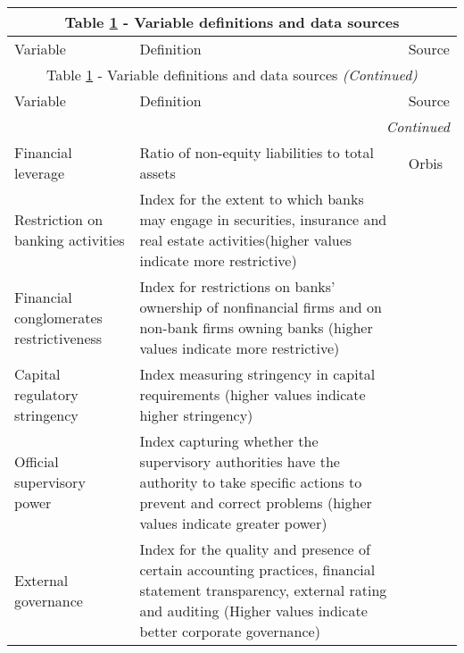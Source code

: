 	\centering
		\begin{longtable}{p{2.5in}p{4in}p{2in}}
				\label{tab:definition}\\
			\multicolumn{3}{c}{Table \ref{tab:definition} - Variable definitions and data sources}\\
			\hline 
			Variable      & Definition & Source \\
			\hline \endfirsthead
			
				\multicolumn{3}{c}{Table \ref{tab:definition} - Variable definitions and data sources \textit{(Continued)}}\\
			\hline 
			Variable      & Definition & Source \\
			\hline \endhead
			
			\hline
			\multicolumn{3}{r}{{\textit{Continued}}}\\ 
			\endfoot
			\hline
			\endlastfoot
			Financial leverage      & Ratio of non-equity liabilities to total assets & Orbis \\
		
		Restriction on banking activities & Index for the extent to which banks may engage in securities, insurance and real estate activities(higher values indicate more restrictive) & \cite{barth2013bank}\\
			
			Financial conglomerates restrictiveness & Index for restrictions on banks' ownership of nonfinancial firms and on non-bank firms owning banks (higher values indicate more restrictive) & \cite{barth2013bank}\\	
			
			Capital regulatory stringency & Index measuring stringency in capital requirements (higher values indicate higher stringency) & \cite{barth2013bank}\\
			
			Official supervisory power & Index capturing whether the supervisory authorities have the authority to take specific actions to prevent and correct problems (higher values indicate greater power) & \cite{barth2013bank}\\	
			
				External governance & Index for the quality and presence of certain accounting practices, financial statement transparency, external rating and auditing  (Higher values indicate better corporate governance) & \cite{barth2013bank}\\
			

\end{longtable}
